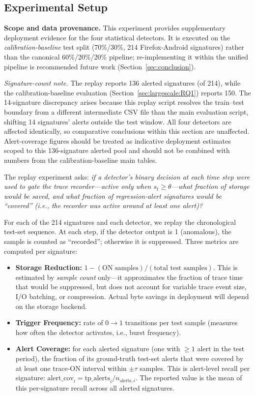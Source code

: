 \documentclass[pdflatex,sn-nature]{sn-jnl}
\theoremstyle{thmstyleone}%
\begin{document}
\subsection{Experimental Setup}\label{sec:replay:setup}

\textbf{Scope and data provenance.}
This experiment provides supplementary deployment evidence for the four
statistical detectors.
It is executed on the \emph{calibration-baseline} test split (70\%/30\%,
214 Firefox-Android signatures) rather than the canonical 60\%/20\%/20\%
pipeline; re-implementing it within the unified pipeline is recommended
future work (Section~\ref{sec:conclusion}).

\noindent\textit{Signature-count note.}
The replay reports 136 alerted signatures (of 214), while the
calibration-baseline evaluation (Section~\ref{sec:largescale:RQ1})
reports 150.
The 14-signature discrepancy arises because this replay script resolves
the train--test boundary from a different intermediate CSV file than the
main evaluation script, shifting 14 signatures' alerts outside the test
window.
All four detectors are affected identically, so comparative conclusions
within this section are unaffected.
Alert-coverage figures should be treated as indicative deployment estimates
scoped to this 136-signature alerted pool and should not be combined with
numbers from the calibration-baseline main tables.

The replay experiment asks: \emph{if a detector's binary decision at each
time step were used to gate the trace recorder---active only when $s_t \geq
\theta$---what fraction of storage would be saved, and what fraction of
regression-alert signatures would be ``covered'' (i.e., the recorder was
active around at least one alert)?}

For each of the 214 signatures and each detector, we replay the chronological
test-set sequence.
At each step, if the detector output is 1 (anomalous), the sample is counted
as ``recorded''; otherwise it is suppressed.
Three metrics are computed per signature:
\begin{itemize}
  \item \textbf{Storage Reduction:} $1 - (\text{ON samples}) / (\text{total test samples})$.
    This is estimated by \emph{sample count} only---it approximates the fraction of
    trace time that would be suppressed, but does not account for variable trace
    event size, I/O batching, or compression.  Actual byte savings in deployment
    will depend on the storage backend.
  \item \textbf{Trigger Frequency:} rate of $0 \to 1$ transitions per test sample
    (measures how often the detector activates, i.e., burst frequency).
  \item \textbf{Alert Coverage:} for each alerted signature (one with $\geq 1$
    alert in the test period), the fraction of its ground-truth test-set alerts
    that were covered by at least one trace-ON interval within $\pm\tau$ samples.
    This is alert-level recall per signature:
    $\text{alert\_cov}_i = \text{tp\_alerts}_i / n_{\text{alerts},i}$.
    The reported value is the mean of this per-signature recall across all alerted
    signatures.
\end{itemize}
\end{document}
